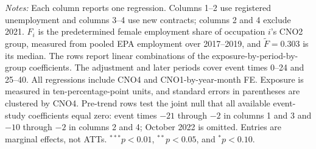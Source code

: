 \begin{table}[!htbp]
\begin{threeparttable}
\begin{tablenotes}[flushleft]
\item \emph{Notes:} Each column reports one regression. Columns 1--2 use registered unemployment and columns 3--4 use new contracts; columns 2 and 4 exclude 2021. $F_i$ is the predetermined female employment share of occupation $i$'s CNO2 group, measured from pooled EPA employment over 2017--2019, and $\widetilde F=0.303$ is its median. The rows report linear combinations of the exposure-by-period-by-group coefficients. The adjustment and later periods cover event times 0--24 and 25--40. All regressions include CNO4 and CNO1-by-year-month FE. Exposure is measured in ten-percentage-point units, and standard errors in parentheses are clustered by CNO4. Pre-trend rows test the joint null that all available event-study coefficients equal zero: event times $-21$ through $-2$ in columns 1 and 3 and $-10$ through $-2$ in columns 2 and 4; October 2022 is omitted. Entries are marginal effects, not ATTs. $^{***}p<0.01$, $^{**}p<0.05$, and $^{*}p<0.10$.
\end{tablenotes}
\end{threeparttable}
\end{table}
